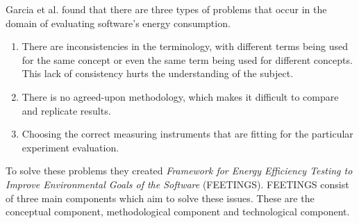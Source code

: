 



Garcia et al. found that there are three types of problems that occur in the domain of evaluating software's energy consumption.\cite{GarciaFEETINGS} 
\begin{enumerate}
    \item There are inconsistencies in the terminology, with different terms being used for the same concept or even the same term being used for different concepts. This lack of consistency hurts the understanding of the subject.
    \item There is no agreed-upon methodology, which makes it difficult to compare and replicate results.
    \item Choosing the correct measuring instruments that are fitting for the particular experiment evaluation.
\end{enumerate}

To solve these problems they created \textit{Framework for Energy Efficiency Testing to Improve Environmental Goals of the Software} (FEETINGS). FEETINGS consist of three main components which aim to solve these issues. These are the conceptual component, methodological component and technological component.\cite{GarciaFEETINGS}\nytafsnit

%

